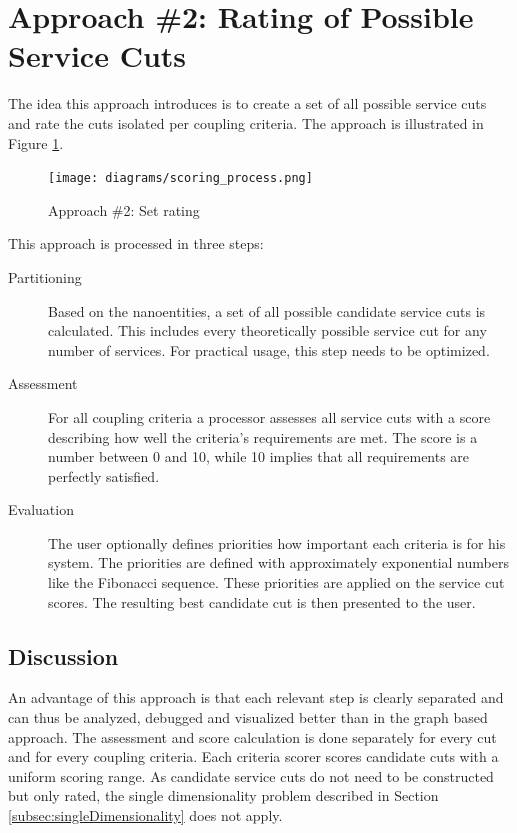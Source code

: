 \section{Approach \#2: Rating of Possible Service Cuts}

The idea this approach introduces is to create a set of all possible service cuts and rate the cuts isolated per coupling criteria. The approach is illustrated in Figure \ref{fig:setProcess}.

\begin{figure}[H]
	\begin{center}
		\texttt{[image: diagrams/scoring\_process.png]}
	\end{center}
	\caption{Approach \#2: Set rating}
	\label{fig:setProcess}
\end{figure}

This approach is processed in three steps:

\begin{description}
	\item[Partitioning] Based on the nanoentities, a set of all possible candidate service cuts is calculated. This includes every theoretically possible service cut for any number of services. For practical usage, this step needs to be optimized. 
	\item[Assessment] For all coupling criteria a processor assesses all service cuts with a score describing how well the criteria's requirements are met. The score is a number between 0 and 10, while 10 implies that all requirements are perfectly satisfied. 
	\item[Evaluation] The user optionally defines priorities how important each criteria is for his system. The priorities are defined with approximately exponential numbers like the Fibonacci sequence. These priorities are applied on the service cut scores. The resulting best candidate cut is then presented to the user.
\end{description}

\subsection{Discussion}

An advantage of this approach is that each relevant step is clearly separated and can thus be analyzed, debugged and visualized better than in the graph based approach. The assessment and score calculation is done separately for every cut and for every coupling criteria. Each criteria scorer scores candidate cuts with a uniform scoring range. As candidate service cuts do not need to be constructed but only rated, the single dimensionality problem described in Section \ref{subsec:singleDimensionality} does not apply.

